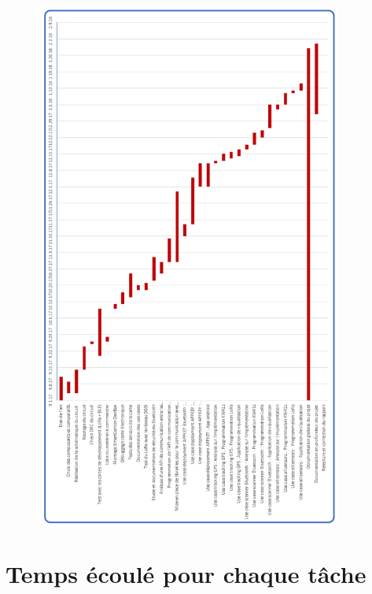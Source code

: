 \begin{figure}[ht!]
    \centering
    \includegraphics[width=0.9\textwidth]{Figures/Appendixes/gantt_planning_estimate.png}
    \label{figapdx-gantt_planning_estimate}
\end{figure}

\FloatBarrier
\newpage
\newpage
\section{Temps écoulé pour chaque tâche}
\label{AppendixGanttPlanning_real_time} 

